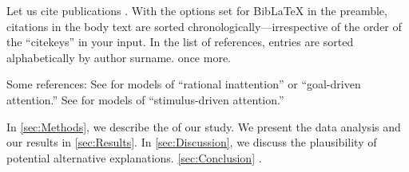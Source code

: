 Let us cite  publications \citep{Andersen2008, Andreoni2012, Balakrishnan2016, Bursztyn2025, Lisi1995}. With the options set for BibLaTeX in the preamble, citations in the body text are sorted chronologically---irrespective of the order of the ``citekeys'' in your input. In the list of references, entries are sorted alphabetically by author surname. \cite{Andersen2008} once more.

\blindtext[1]

Some references: See \cite{Sims2003, Gabaix2014} for models of ``rational inattention'' or ``goal-driven attention.'' See \cite{Bordalo2012, Bordalo2013, Koszegi2013, Taubinsky2014, Bushong2016} for models of ``stimulus-driven attention.''%

\blindmathtrue

\blindtext[2]

In \autoref{sec:Methods}, we describe the  of our study. We present the data analysis and our results in \autoref{sec:Results}. In \autoref{sec:Discussion}, we discuss the plausibility of potential alternative explanations. \autoref{sec:Conclusion} .